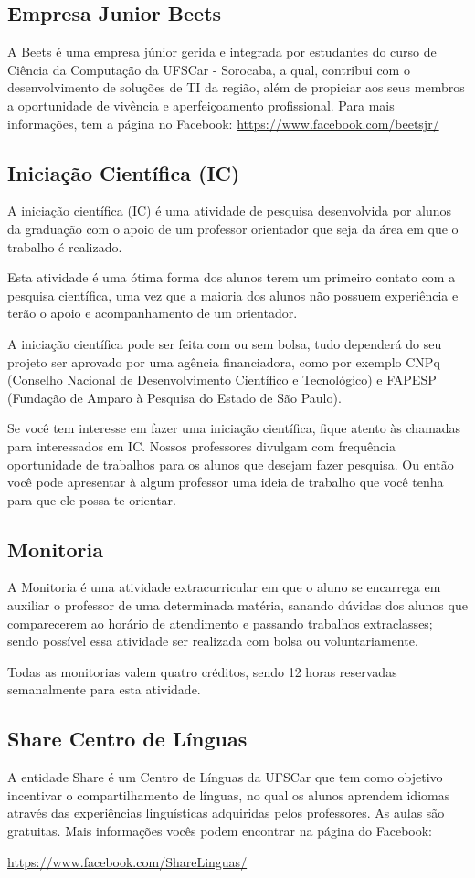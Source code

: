 \subsection{Empresa Junior Beets}
A Beets é uma empresa júnior gerida e integrada por estudantes do curso de Ciência da Computação da UFSCar - Sorocaba, a qual, contribui com o desenvolvimento de soluções de TI da região, além de propiciar aos seus membros a oportunidade de vivência e aperfeiçoamento profissional. Para mais informações, tem a página no Facebook: \newline \url{https://www.facebook.com/beetsjr/}

\subsection{Iniciação Científica (IC)}
A iniciação científica (IC) é uma atividade de pesquisa desenvolvida por alunos da graduação com o apoio de um professor orientador que seja da área em que o trabalho é realizado.

Esta atividade é uma ótima forma dos alunos terem um primeiro contato com a pesquisa científica, uma vez que a maioria dos alunos não possuem experiência e terão o apoio e acompanhamento de um orientador.

A iniciação científica pode ser feita com ou sem bolsa, tudo dependerá do seu projeto ser aprovado por uma agência financiadora,  como por exemplo CNPq (Conselho Nacional de Desenvolvimento Científico e Tecnológico) e FAPESP (Fundação de Amparo à Pesquisa do Estado de São Paulo). 

Se você tem interesse em fazer uma iniciação científica, fique atento às chamadas para interessados em IC. Nossos professores divulgam com frequência oportunidade de trabalhos para os alunos que desejam fazer pesquisa. Ou então você pode apresentar à algum professor uma ideia de trabalho que você tenha para que ele possa te orientar.

\subsection{Monitoria}
A Monitoria é uma atividade extracurricular em que o aluno se encarrega em auxiliar o professor de uma determinada matéria, sanando dúvidas dos alunos que comparecerem ao horário de atendimento e passando trabalhos extraclasses; sendo possível essa atividade ser realizada com bolsa ou voluntariamente.

Todas as monitorias valem quatro créditos, sendo 12 horas reservadas semanalmente para esta atividade.

\subsection{Share Centro de Línguas}
A entidade Share é um Centro de Línguas da UFSCar que tem como objetivo incentivar o compartilhamento de línguas, no qual os alunos aprendem idiomas através das experiências linguísticas adquiridas pelos professores. As aulas são gratuitas.
Mais informações vocês podem encontrar na página do Facebook:

\url{https://www.facebook.com/ShareLinguas/}